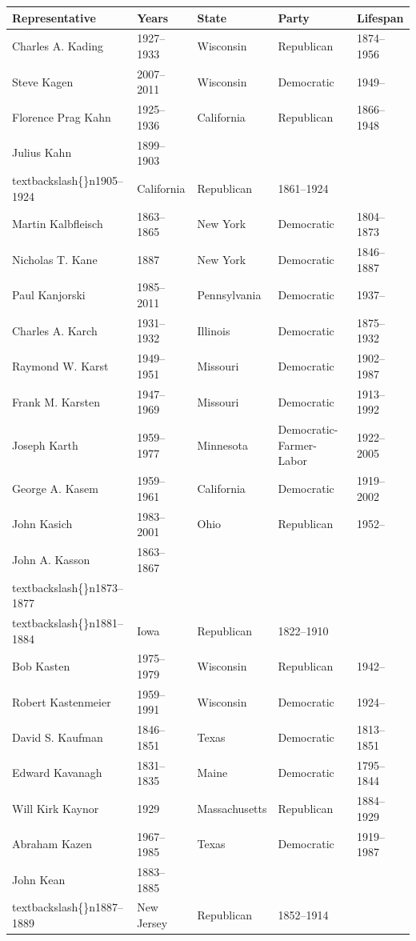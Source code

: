 \documentclass{article}
\begin{document}
\begin{tabular}{lllll}
\toprule
Representative & Years & State & Party & Lifespan \\
\midrule
Charles A. Kading & 1927–1933 & Wisconsin & Republican & 1874–1956 \\
Steve Kagen & 2007–2011 & Wisconsin & Democratic & 1949– \\
Florence Prag Kahn & 1925–1936 & California & Republican & 1866–1948 \\
Julius Kahn & 1899–1903\\textbackslash\{\}n1905–1924 & California & Republican & 1861–1924 \\
Martin Kalbfleisch & 1863–1865 & New York & Democratic & 1804–1873 \\
Nicholas T. Kane & 1887 & New York & Democratic & 1846–1887 \\
Paul Kanjorski & 1985–2011 & Pennsylvania & Democratic & 1937– \\
Charles A. Karch & 1931–1932 & Illinois & Democratic & 1875–1932 \\
Raymond W. Karst & 1949–1951 & Missouri & Democratic & 1902–1987 \\
Frank M. Karsten & 1947–1969 & Missouri & Democratic & 1913–1992 \\
Joseph Karth & 1959–1977 & Minnesota & Democratic-Farmer-Labor & 1922–2005 \\
George A. Kasem & 1959–1961 & California & Democratic & 1919–2002 \\
John Kasich & 1983–2001 & Ohio & Republican & 1952– \\
John A. Kasson & 1863–1867\\textbackslash\{\}n1873–1877\\textbackslash\{\}n1881–1884 & Iowa & Republican & 1822–1910 \\
Bob Kasten & 1975–1979 & Wisconsin & Republican & 1942– \\
Robert Kastenmeier & 1959–1991 & Wisconsin & Democratic & 1924– \\
David S. Kaufman & 1846–1851 & Texas & Democratic & 1813–1851 \\
Edward Kavanagh & 1831–1835 & Maine & Democratic & 1795–1844 \\
Will Kirk Kaynor & 1929 & Massachusetts & Republican & 1884–1929 \\
Abraham Kazen & 1967–1985 & Texas & Democratic & 1919–1987 \\
John Kean & 1883–1885\\textbackslash\{\}n1887–1889 & New Jersey & Republican & 1852–1914 \\

\end{tabular}
\end{document}
